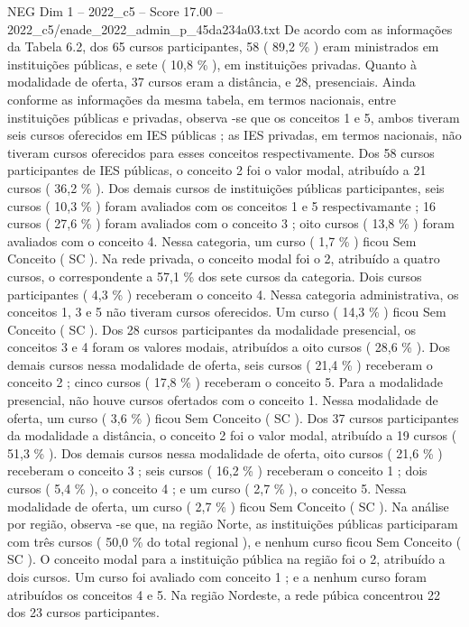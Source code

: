 \begin{textsample}{NEG Dim 1 – 2022\_c5 – Score 17.00 – 2022\_c5/enade\_2022\_admin\_p\_45da234a03.txt}
De acordo com as informações da Tabela 6.2, dos 65 cursos participantes, 58 ( 89,2 \% ) eram ministrados em instituições públicas, e sete ( 10,8 \% ), em instituições privadas.
Quanto à modalidade de oferta, 37 cursos eram a distância, e 28, presenciais.
Ainda conforme as informações da mesma tabela, em termos nacionais, entre instituições públicas e privadas, observa -se que os conceitos 1 e 5, ambos tiveram seis cursos oferecidos em IES públicas ; as IES privadas, em termos nacionais, não tiveram cursos oferecidos para esses conceitos respectivamente.
Dos 58 cursos participantes de IES públicas, o conceito 2 foi o valor modal, atribuído a 21 cursos ( 36,2 \% ).
Dos demais cursos de instituições públicas participantes, seis cursos ( 10,3 \% ) foram avaliados com os conceitos 1 e 5 respectivamante ; 16 cursos ( 27,6 \% ) foram avaliados com o conceito 3 ; oito cursos ( 13,8 \% ) foram avaliados com o conceito 4.
Nessa categoria, um curso ( 1,7 \% ) ficou Sem Conceito ( SC ).
Na rede privada, o conceito modal foi o 2, atribuído a quatro cursos, o correspondente a 57,1 \% dos sete cursos da categoria.
Dois cursos participantes ( 4,3 \% ) receberam o conceito 4.
Nessa categoria administrativa, os conceitos 1, 3 e 5 não tiveram cursos oferecidos.
Um curso ( 14,3 \% ) ficou Sem Conceito ( SC ).
Dos 28 cursos participantes da modalidade presencial, os conceitos 3 e 4 foram os valores modais, atribuídos a oito cursos ( 28,6 \% ).
Dos demais cursos nessa modalidade de oferta, seis cursos ( 21,4 \% ) receberam o conceito 2 ; cinco cursos ( 17,8 \% ) receberam o conceito 5.
Para a modalidade presencial, não houve cursos ofertados com o conceito 1.
Nessa modalidade de oferta, um curso ( 3,6 \% ) ficou Sem Conceito ( SC ).
Dos 37 cursos participantes da modalidade a distância, o conceito 2 foi o valor modal, atribuído a 19 cursos ( 51,3 \% ).
Dos demais cursos nessa modalidade de oferta, oito cursos ( 21,6 \% ) receberam o conceito 3 ; seis cursos ( 16,2 \% ) receberam o conceito 1 ; dois cursos ( 5,4 \% ), o conceito 4 ; e um curso ( 2,7 \% ), o conceito 5.
Nessa modalidade de oferta, um curso ( 2,7 \% ) ficou Sem Conceito ( SC ).
Na análise por região, observa -se que, na região Norte, as instituições públicas participaram com três cursos ( 50,0 \% do total regional ), e nenhum curso ficou Sem Conceito ( SC ).
O conceito modal para a instituição pública na região foi o 2, atribuído a dois cursos.
Um curso foi avaliado com conceito 1 ; e a nenhum curso foram atribuídos os conceitos 4 e 5.
Na região Nordeste, a rede púbica concentrou 22 dos 23 cursos participantes.

\end{textsample}
